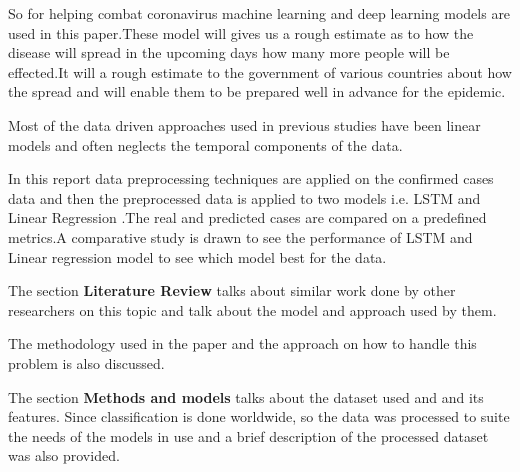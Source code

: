 So for helping combat coronavirus machine learning and deep learning models are used in this paper.These model
will gives us a rough estimate as to how the disease will spread in the upcoming days how many more people
will be effected.It will a rough estimate to the government of various countries about how the spread and will
enable them to be prepared well in advance for the epidemic.

Most of the data driven approaches used in previous studies
\cite{knight2016bridging} have been linear models and often neglects the
temporal components of the data.


In this report data preprocessing techniques are  applied on the confirmed cases data and then the preprocessed
data is applied to two models i.e. LSTM and Linear Regression .The real and predicted cases are compared on
a predefined metrics.A comparative study is drawn to see the performance of
LSTM and Linear regression model to see which model best for the data.

The section \textbf{Literature Review} talks about similar work done by
other researchers on this topic and talk about the model and approach used by
them.

The methodology used in the paper and the approach on how to handle this
problem is also discussed.

The section \textbf{Methods and models} talks about the dataset used and and its
features. Since classification is done worldwide, so the data was processed to
suite the needs of the models in use and a brief description of the processed
dataset was also provided.

